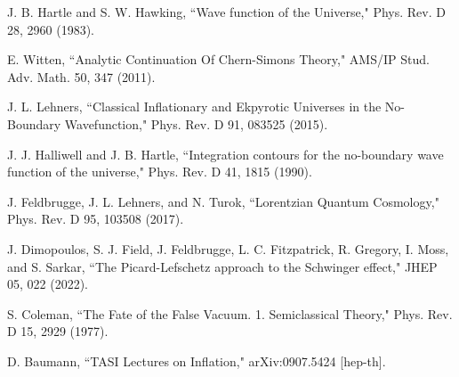 \documentclass{article}
\begin{document}

\begin{thebibliography}{9}

 J. B. Hartle and S. W. Hawking, ``Wave function of the Universe," Phys. Rev. D 28, 2960 (1983).

 E. Witten, ``Analytic Continuation Of Chern-Simons Theory," AMS/IP Stud. Adv. Math. 50, 347 (2011).

 J. L. Lehners, ``Classical Inflationary and Ekpyrotic Universes in the No-Boundary Wavefunction," Phys. Rev. D 91, 083525 (2015).

 J. J. Halliwell and J. B. Hartle, ``Integration contours for the no-boundary wave function of the universe," Phys. Rev. D 41, 1815 (1990).

 J. Feldbrugge, J. L. Lehners, and N. Turok, ``Lorentzian Quantum Cosmology," Phys. Rev. D 95, 103508 (2017).

 J. Dimopoulos, S. J. Field, J. Feldbrugge, L. C. Fitzpatrick, R. Gregory, I. Moss, and S. Sarkar, ``The Picard-Lefschetz approach to the Schwinger effect," JHEP 05, 022 (2022).

 S. Coleman, ``The Fate of the False Vacuum. 1. Semiclassical Theory," Phys. Rev. D 15, 2929 (1977).

 D. Baumann, ``TASI Lectures on Inflation," arXiv:0907.5424 [hep-th].

\end{thebibliography}
\end{document}
